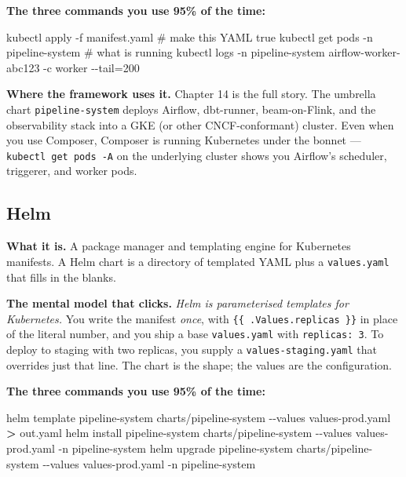 \documentclass[
  11pt,
  british,
  oneside]{book}
\newenvironment{Shaded}{\begin{snugshade}}{\end{snugshade}}
\newcommand{\ExtensionTok}[1]{#1}
\newcommand{\NormalTok}[1]{#1}
\newcommand{\OperatorTok}[1]{\textcolor[rgb]{0.81,0.36,0.00}{\textbf{#1}}}
\begin{document}
\textbf{The three commands you use 95\% of the time:}

\begin{Shaded}
\begin{Highlighting}[]
\ExtensionTok{kubectl}\NormalTok{ apply {-}f manifest.yaml          \# make this YAML true}
\ExtensionTok{kubectl}\NormalTok{ get pods {-}n pipeline{-}system     \# what is running}
\ExtensionTok{kubectl}\NormalTok{ logs {-}n pipeline{-}system airflow{-}worker{-}abc123 {-}c worker {-}{-}tail=200}
\end{Highlighting}
\end{Shaded}

\textbf{Where the framework uses it.} Chapter 14 is the full story. The
umbrella chart \texttt{pipeline-system} deploys Airflow, dbt-runner,
beam-on-Flink, and the observability stack into a GKE (or other
CNCF-conformant) cluster. Even when you use Composer, Composer is
running Kubernetes under the bonnet --- \texttt{kubectl\ get\ pods\ -A}
on the underlying cluster shows you Airflow's scheduler, triggerer, and
worker pods.

\hypertarget{helm}{%
\subsection{Helm}\label{helm}}

\textbf{What it is.} A package manager and templating engine for
Kubernetes manifests. A Helm chart is a directory of templated YAML plus
a \texttt{values.yaml} that fills in the blanks.

\textbf{The mental model that clicks.} \emph{Helm is parameterised
templates for Kubernetes.} You write the manifest \emph{once}, with
\texttt{\{\{\ .Values.replicas\ \}\}} in place of the literal number,
and you ship a base \texttt{values.yaml} with \texttt{replicas:\ 3}. To
deploy to staging with two replicas, you supply a
\texttt{values-staging.yaml} that overrides just that line. The chart is
the shape; the values are the configuration.

\textbf{The three commands you use 95\% of the time:}

\begin{Shaded}
\begin{Highlighting}[]
\ExtensionTok{helm}\NormalTok{ template pipeline{-}system charts/pipeline{-}system {-}{-}values values{-}prod.yaml }\OperatorTok{\textgreater{}}\NormalTok{ out.yaml}
\ExtensionTok{helm}\NormalTok{ install pipeline{-}system charts/pipeline{-}system {-}{-}values values{-}prod.yaml {-}n pipeline{-}system}
\ExtensionTok{helm}\NormalTok{ upgrade pipeline{-}system charts/pipeline{-}system {-}{-}values values{-}prod.yaml {-}n pipeline{-}system}
\end{Highlighting}
\end{Shaded}
\end{document}
